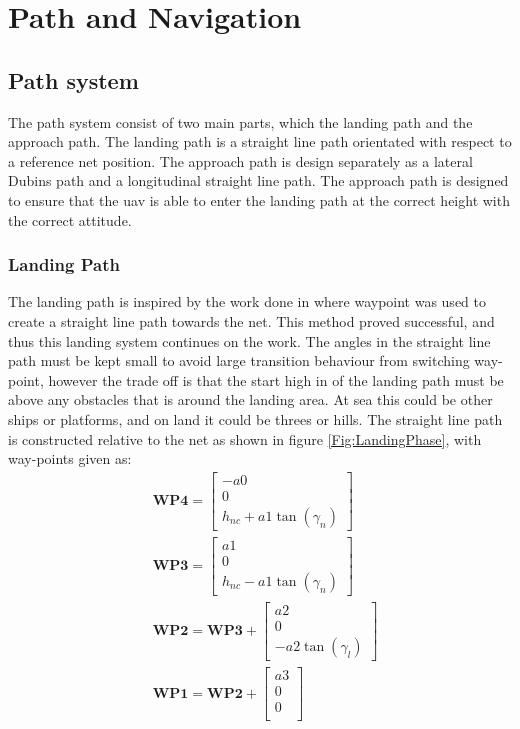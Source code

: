 \chapter{Path and Navigation}
\section{Path system}\label{Ch:LandingPath}
The path system consist of two main parts, which the landing path and the approach path. The landing path is a straight line path orientated with respect to a reference net position. The approach path is design separately as a lateral Dubins path and a longitudinal straight line path. The approach path is designed to ensure that the \gls{uav} is able to enter the landing path at the correct height with the correct attitude.
\subsection{Landing Path}\label{SS:netApproach}
The landing path is inspired by the work done in \citep{Skulstad&Syversen} where waypoint was used to create a straight line path towards the net. This method proved successful, and thus this landing system continues on the work. The angles in the straight line path must be kept small to avoid large transition behaviour from switching way-point, however the trade off is that the start high in of the landing path must be above any obstacles that is around the landing area. At sea this could be other ships or platforms, and on land it could be threes or hills. The straight line path is constructed relative to the net as shown in figure \ref{Fig:LandingPhase}, with way-points given as:
\begin{subequations}
\begin{align}
&\mathbf{WP4} = 
\begin{bmatrix}
-a0 \\
0 \\
h_{nc} + a1\tan(\gamma_n) 
\end{bmatrix}\\
&\mathbf{WP3} = 
\begin{bmatrix}
a1 \\
0 \\
h_{nc} - a1\tan(\gamma_n)
\end{bmatrix}\\
&\mathbf{WP2} = \mathbf{WP3} + 
\begin{bmatrix}
a2 \\
0 \\
-a2\tan(\gamma_l)
\end{bmatrix}\\
&\mathbf{WP1} = \mathbf{WP2} + 
\begin{bmatrix}
a3 \\
0 \\
0 \\
\end{bmatrix}
\end{align}
\end{subequations}
